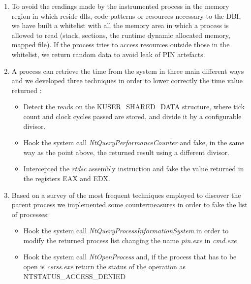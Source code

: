 \begin{enumerate}
\item To avoid the readings made by the instrumented process in the memory region in which reside dlls, code patterns or resources necessary to the DBI, we have built a whitelist with all the memory area in which a process is allowed to read (stack, sections, the runtime dynamic allocated memory, mapped file). If the process tries to access resources outside those in the whitelist, we return random data to avoid leak of PIN artefacts.

\item A process can retrieve the time from the system in three main different ways and we developed three techniques in order to lower correctly the time value returned :

\begin{itemize}
\item Detect the reads on the KUSER\_SHARED\_DATA structure, where tick count and clock cycles passed are stored, and divide it by a configurable divisor.

\item Hook the system call \textit{NtQueryPerformanceCounter} and fake, in the same way as the point above, the returned result using a different divisor.

\item Intercepted the \textit{rtdsc} assembly instruction and fake the value returned in the registers EAX and EDX.
\end{itemize}

\item Based on a survey \cite{Controlling-Windows-process-list} of the most frequent techniques employed to discover the parent process we implemented some countermeasures in order to fake the list of processes:

\begin{itemize}
\item Hook the system call \textit{NtQueryProcessInformationSystem} in order to modify the returned process list changing the name \textit{pin.exe} in \textit{cmd.exe}

\item Hook the system call \textit{NtOpenProcess} and, if the process that has to be open is \textit{csrss.exe} return the status of the operation as NTSTATUS\_ACCESS\_DENIED
\end{itemize}

\end{enumerate}

